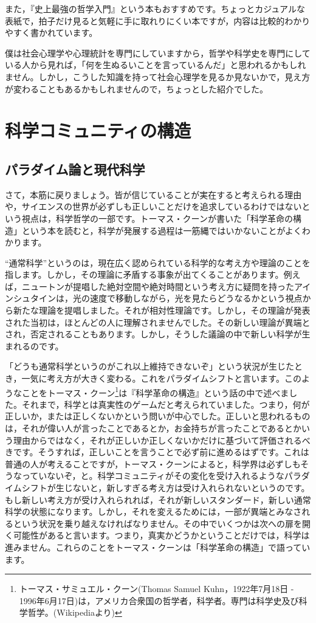 \documentclass{ltjsbook}
\begin{document}
また，『史上最強の哲学入門』という本\parencite{yamucha2015}もおすすめです。ちょっとカジュアルな表紙で，拍子だけ見ると気軽に手に取れりにくい本ですが，内容は比較的わかりやすく書かれています。

僕は社会心理学や心理統計を専門にしていますから，哲学や科学史を専門にしている人から見れば，「何を生ぬるいことを言っているんだ」と思われるかもしれません。しかし，こうした知識を持って社会心理学を見るか見ないかで，見え方が変わることもあるかもしれませんので，ちょっとした紹介でした。

\section{科学コミュニティの構造}
\subsection{パラダイム論と現代科学}
さて，本筋に戻りましょう。皆が信じていることが実在すると考えられる理由や，サイエンスの世界が必ずしも正しいことだけを追求しているわけではないという視点は，科学哲学の一部です。トーマス・クーンが書いた「科学革命の構造」という本\parencite{ThomasKuhn1962}を読むと，科学が発展する過程は一筋縄ではいかないことがよくわかります。

``通常科学''というのは，現在広く認められている科学的な考え方や理論のことを指します。しかし，その理論に矛盾する事象が出てくることがあります。例えば，ニュートンが提唱した絶対空間や絶対時間という考え方に疑問を持ったアインシュタインは，光の速度で移動しながら，光を見たらどうなるかという視点から新たな理論を提唱しました。それが相対性理論です。しかし，その理論が発表された当初は，ほとんどの人に理解されませんでした。その新しい理論が異端とされ，否定されることもあります。しかし，そうした議論の中で新しい科学が生まれるのです。

「どうも通常科学というのがこれ以上維持できないぞ」という状況が生じたとき，一気に考え方が大きく変わる。これをパラダイムシフトと言います。このようなことをトーマス・クーン\footnote{トーマス・サミュエル・クーン(Thomas Samuel Kuhn，1922年7月18日 - 1996年6月17日)は，アメリカ合衆国の哲学者，科学者。専門は科学史及び科学哲学。(Wikipediaより)}は『科学革命の構造』という話の中で述べました。それまで，科学とは真実性のゲームだと考えられていました。つまり，何が正しいか，または正しくないかという問いが中心でした。正しいと思われるものは，それが偉い人が言ったことであるとか，お金持ちが言ったことであるとかいう理由からではなく，それが正しいか正しくないかだけに基づいて評価されるべきです。そうすれば，正しいことを言うことで必ず前に進めるはずです。これは普通の人が考えることですが，トーマス・クーンによると，科学界は必ずしもそうなっていないぞ，と。科学コミュニティがその変化を受け入れるようなパラダイムシフトが生じないと，新しすぎる考え方は受け入れられないというのです。もし新しい考え方が受け入れられれば，それが新しいスタンダード，新しい通常科学の状態になります。しかし，それを変えるためには，一部が異端とみなされるという状況を乗り越えなければなりません。その中でいくつかは次への扉を開く可能性があると言います。つまり，真実かどうかということだけでは，科学は進みません。これらのことをトーマス・クーンは「科学革命の構造」で語っています。
\end{document}
